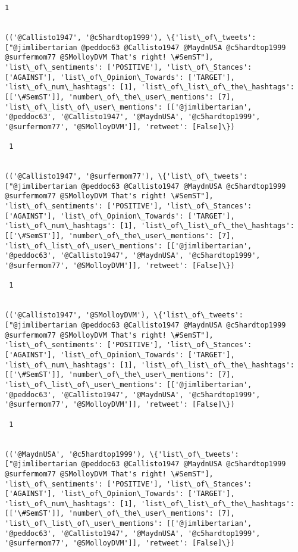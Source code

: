 \documentclass[11pt]{article}
\begin{document}
\begin{Verbatim}[commandchars=\\\{\}]
 1
 

(('@Callisto1947', '@c5hardtop1999'), \{'list\_of\_tweets': ["@jimlibertarian @peddoc63 @Callisto1947 @MaydnUSA @c5hardtop1999 @surfermom77 @SMolloyDVM That's right! \#SemST"], 'list\_of\_sentiments': ['POSITIVE'], 'list\_of\_Stances': ['AGAINST'], 'list\_of\_Opinion\_Towards': ['TARGET'], 'list\_of\_num\_hashtags': [1], 'list\_of\_list\_of\_the\_hashtags': [['\#SemST']], 'number\_of\_the\_user\_mentions': [7], 'list\_of\_list\_of\_user\_mentions': [['@jimlibertarian', '@peddoc63', '@Callisto1947', '@MaydnUSA', '@c5hardtop1999', '@surfermom77', '@SMolloyDVM']], 'retweet': [False]\})

 1
 

(('@Callisto1947', '@surfermom77'), \{'list\_of\_tweets': ["@jimlibertarian @peddoc63 @Callisto1947 @MaydnUSA @c5hardtop1999 @surfermom77 @SMolloyDVM That's right! \#SemST"], 'list\_of\_sentiments': ['POSITIVE'], 'list\_of\_Stances': ['AGAINST'], 'list\_of\_Opinion\_Towards': ['TARGET'], 'list\_of\_num\_hashtags': [1], 'list\_of\_list\_of\_the\_hashtags': [['\#SemST']], 'number\_of\_the\_user\_mentions': [7], 'list\_of\_list\_of\_user\_mentions': [['@jimlibertarian', '@peddoc63', '@Callisto1947', '@MaydnUSA', '@c5hardtop1999', '@surfermom77', '@SMolloyDVM']], 'retweet': [False]\})

 1
 

(('@Callisto1947', '@SMolloyDVM'), \{'list\_of\_tweets': ["@jimlibertarian @peddoc63 @Callisto1947 @MaydnUSA @c5hardtop1999 @surfermom77 @SMolloyDVM That's right! \#SemST"], 'list\_of\_sentiments': ['POSITIVE'], 'list\_of\_Stances': ['AGAINST'], 'list\_of\_Opinion\_Towards': ['TARGET'], 'list\_of\_num\_hashtags': [1], 'list\_of\_list\_of\_the\_hashtags': [['\#SemST']], 'number\_of\_the\_user\_mentions': [7], 'list\_of\_list\_of\_user\_mentions': [['@jimlibertarian', '@peddoc63', '@Callisto1947', '@MaydnUSA', '@c5hardtop1999', '@surfermom77', '@SMolloyDVM']], 'retweet': [False]\})

 1
 

(('@MaydnUSA', '@c5hardtop1999'), \{'list\_of\_tweets': ["@jimlibertarian @peddoc63 @Callisto1947 @MaydnUSA @c5hardtop1999 @surfermom77 @SMolloyDVM That's right! \#SemST"], 'list\_of\_sentiments': ['POSITIVE'], 'list\_of\_Stances': ['AGAINST'], 'list\_of\_Opinion\_Towards': ['TARGET'], 'list\_of\_num\_hashtags': [1], 'list\_of\_list\_of\_the\_hashtags': [['\#SemST']], 'number\_of\_the\_user\_mentions': [7], 'list\_of\_list\_of\_user\_mentions': [['@jimlibertarian', '@peddoc63', '@Callisto1947', '@MaydnUSA', '@c5hardtop1999', '@surfermom77', '@SMolloyDVM']], 'retweet': [False]\})


\end{Verbatim}
\end{document}
